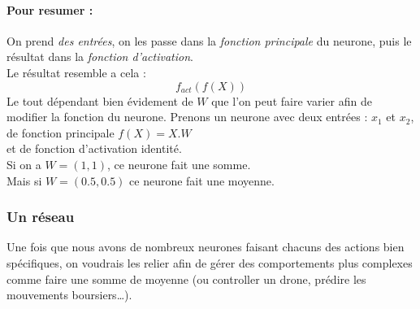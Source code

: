 \paragraph{Pour resumer :}
On prend \textit{des entrées},
on les passe dans la \textit{fonction principale} du neurone,
puis le résultat dans la \textit{fonction d'activation}. \\
Le résultat resemble a cela :
\begin{equation}
    f_{act}(f(X))
\end{equation}
Le tout dépendant bien évidement de $W$ que l'on peut faire varier afin de modifier la fonction du neurone.
\exemle
{
Prenons un neurone avec deux entrées : $x_1$ et $x_2$, \\
de fonction principale $f(X) = X.W$ \\
et de fonction d'activation identité. \\
Si on a $W = (1, 1)$, ce neurone fait une somme.\\
Mais si $W = (0.5, 0.5)$ ce neurone fait une moyenne.
}


\subsubsection{Un réseau}
Une fois que nous avons de nombreux neurones faisant chacuns des actions bien spécifiques,
on voudrais les relier afin de gérer des comportements plus complexes
comme faire une somme de moyenne (ou controller un drone, prédire les mouvements boursiers\ldots).

